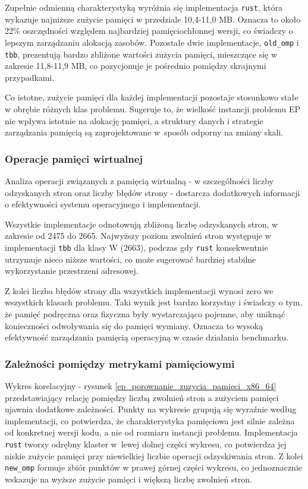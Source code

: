 Zupełnie odmienną charakterystyką wyróżnia się implementacja \texttt{rust}, która wykazuje najniższe zużycie pamięci w przedziale 10,4-11,0 MB. Oznacza to około 22\% oszczędności względem najbardziej pamięciochłonnej wersji, co świadczy o lepszym zarządzaniu alokacją zasobów. Pozostałe dwie implementacje, \texttt{old\_omp} i \texttt{tbb}, prezentują bardzo zbliżone wartości zużycia pamięci, mieszczące się w zakresie 11,8-11,9 MB, co pozycjonuje je pośrednio pomiędzy skrajnymi przypadkami.

Co istotne, zużycie pamięci dla każdej implementacji pozostaje stosunkowo stałe w obrębie różnych klas problemu. Sugeruje to, że wielkość instancji problemu EP nie wpływa istotnie na alokację pamięci, a struktury danych i strategie zarządzania pamięcią są zaprojektowane w~sposób odporny na zmiany skali.

\subsubsection{Operacje pamięci wirtualnej}
Analiza operacji związanych z pamięcią wirtualną - w szczególności liczby odzyskanych stron oraz liczby błędów strony - dostarcza dodatkowych informacji o efektywności systemu operacyjnego i implementacji.

Wszystkie implementacje odnotowują zbliżoną liczbę odzyskanych stron, w zakresie od 2475 do 2665. Najwyższy poziom zwolnień stron występuje w implementacji \texttt{tbb} dla klasy W (2663), podczas gdy \texttt{rust} konsekwentnie utrzymuje nieco niższe wartości, co może sugerować bardziej stabilne wykorzystanie przestrzeni adresowej.

Z kolei liczba błędów strony dla wszystkich implementacji wynosi zero we wszystkich klasach problemu. Taki wynik jest bardzo korzystny i świadczy o tym, że pamięć podręczna oraz fizyczna były wystarczająco pojemne, aby uniknąć konieczności odwoływania się do pamięci wymiany. Oznacza to wysoką efektywność zarządzania pamięcią operacyjną w czasie działania benchmarku.

\subsubsection{Zależności pomiędzy metrykami pamięciowymi}
Wykres korelacyjny - rysunek \ref{ep_porownanie_zuzycia_pamieci_x86_64} przedstawiający relację pomiędzy liczbą zwolnień stron a zużyciem pamięci ujawnia dodatkowe zależności. Punkty na wykresie grupują się wyraźnie według implementacji, co potwierdza, że charakterystyka pamięciowa jest silnie zależna od konkretnej wersji kodu, a nie od rozmiaru instancji problemu. Implementacja \texttt{rust} tworzy odrębny klaster w~lewej dolnej części wykresu, co potwierdza jej niskie zużycie pamięci przy niewielkiej liczbie operacji odzyskiwania stron. Z kolei \texttt{new\_omp} formuje zbiór punktów w prawej górnej części wykresu, co jednoznacznie wskazuje na wyższe zużycie pamięci i większą liczbę zwolnień stron.

